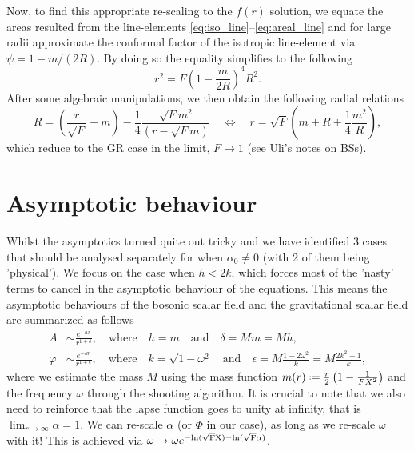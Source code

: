 \documentclass[12pt]{article}
\numberwithin{equation}{section}
\newcommand*{\defeq}{\mathrel{\vcenter{\baselineskip0.5ex \lineskiplimit0pt
                     \hbox{\scriptsize.}\hbox{\scriptsize.}}}%
                     =}
\begin{document}
Now, to find this appropriate re-scaling to the $f(r)$ solution, we equate the areas resulted from the line-elements \eqref{eq:iso_line}--\eqref{eq:areal_line} and for large radii approximate the conformal factor of the isotropic line-element via $\psi = 1 - m/(2R)$. By doing so the equality simplifies to the following
\begin{equation}
    r^2 = F \left(1- \frac{m}{2R} \right)^4 R^2.
\end{equation}
After some algebraic manipulations, we then obtain the following radial relations
\begin{equation}
    R = \left(\frac{r}{\sqrt{F}} -m \right) - \frac{1}{4}\frac{\sqrt{F}m^2}{\left(r - \sqrt{F}m \right)} \quad \Leftrightarrow \quad r = \sqrt{F} \left(m + R + \frac{1}{4}\frac{m^2}{R} \right),
\end{equation}
which reduce to the GR case in the limit, $F \to 1$ (see Uli's notes on BSs).

\section{Asymptotic behaviour}
Whilst the asymptotics turned quite out tricky and we have identified 3 cases that should be analysed separately for when $\alpha_0 \neq 0$ (with 2 of them being 'physical'). We focus on the case when $h < 2k$, which forces most of the 'nasty' terms to cancel in the asymptotic behaviour of the equations. This means the asymptotic behaviours of the bosonic scalar field and the gravitational scalar field are summarized as follows
\begin{align}
    A & \sim \frac{e^{-hr}}{r^{1+\delta}}, \quad \text{where} \quad h=m \quad \text{and} \quad \delta = Mm = Mh, \\
    \varphi & \sim \frac{e^{-kr}}{r^{1+\epsilon}}, \quad \text{where} \quad k=\sqrt{1-\omega^2} \quad \text{and} \quad \epsilon = M\frac{1-2\omega^2}{k} = M\frac{2k^2-1}{k},
\end{align}
where we estimate the mass $M$ using the mass function $m(r) \defeq \frac{r}{2} \left(1-\frac{1}{FX^2}\right)$ and the frequency $\omega$ through the shooting algorithm. It is crucial to note that we also need to reinforce that the lapse function goes to unity at infinity, that is $\lim_{r \to \infty} \alpha = 1$. We can re-scale $\alpha$ (or $\Phi$ in our case), as long as we re-scale $\omega$ with it! This is achieved via $\omega \rightarrow \omega e^{-\rm{ln}(\sqrt{F}X) -\rm{ln}(\sqrt{F}\alpha)}$.
\end{document}
